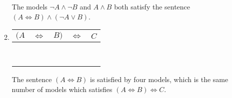\begin{enumerate}
\begin{enumerate}
The models $\neg A \land \neg B$ and $A \land B$ both satisfy the sentence $(A \Leftrightarrow B) \land (\neg A \lor B)$.

\item
\begin{tabular}{ccc|c|c}
$(A$ & $\Leftrightarrow$ & $B)$ & $\Leftrightarrow$ & $C$\\
\hline
\F & \T & \F & \F & \F\\
\F & \T & \F & \T & \T\\
\F & \F & \T & \T & \F\\
\F & \F & \T & \F & \T\\
\T & \F & \F & \T & \F\\
\T & \F & \F & \F & \T\\
\T & \T & \T & \F & \F\\
\T & \T & \T & \T & \T\\
\end{tabular}

The sentence $(A \Leftrightarrow B)$ is satisfied by four models, which is the same number of models which satisfies $(A \Leftrightarrow B) \Leftrightarrow C$.

\end{enumerate}

\end{enumerate}




